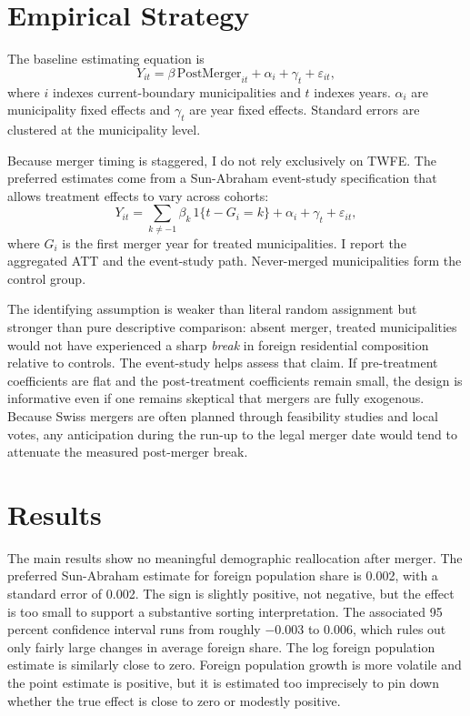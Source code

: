 \documentclass[12pt]{article}
\begin{document}
\section{Empirical Strategy}

The baseline estimating equation is
\begin{equation}
Y_{it} = \beta \, \text{PostMerger}_{it} + \alpha_i + \gamma_t + \varepsilon_{it},
\end{equation}
where $i$ indexes current-boundary municipalities and $t$ indexes years. $\alpha_i$ are municipality fixed effects and $\gamma_t$ are year fixed effects. Standard errors are clustered at the municipality level.

Because merger timing is staggered, I do not rely exclusively on TWFE. The preferred estimates come from a Sun-Abraham event-study specification that allows treatment effects to vary across cohorts:
\begin{equation}
Y_{it} = \sum_{k \neq -1} \beta_k \, 1\{t - G_i = k\} + \alpha_i + \gamma_t + \varepsilon_{it},
\end{equation}
where $G_i$ is the first merger year for treated municipalities. I report the aggregated ATT and the event-study path. Never-merged municipalities form the control group.

The identifying assumption is weaker than literal random assignment but stronger than pure descriptive comparison: absent merger, treated municipalities would not have experienced a sharp \emph{break} in foreign residential composition relative to controls. The event-study helps assess that claim. If pre-treatment coefficients are flat and the post-treatment coefficients remain small, the design is informative even if one remains skeptical that mergers are fully exogenous. Because Swiss mergers are often planned through feasibility studies and local votes, any anticipation during the run-up to the legal merger date would tend to attenuate the measured post-merger break.

\section{Results}



The main results show no meaningful demographic reallocation after merger. The preferred Sun-Abraham estimate for foreign population share is 0.002, with a standard error of 0.002. The sign is slightly positive, not negative, but the effect is too small to support a substantive sorting interpretation. The associated 95 percent confidence interval runs from roughly $-0.003$ to $0.006$, which rules out only fairly large changes in average foreign share. The log foreign population estimate is similarly close to zero. Foreign population growth is more volatile and the point estimate is positive, but it is estimated too imprecisely to pin down whether the true effect is close to zero or modestly positive.
\end{document}
